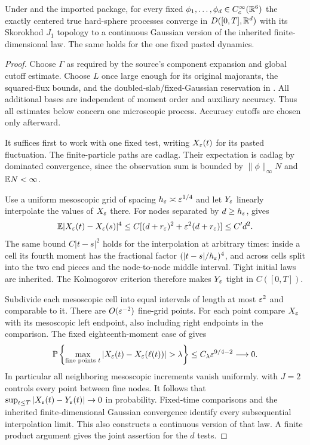 \begin{theorem}\label{thm:functional}
Under  and the imported package, for every fixed
$\phi_1,\ldots,\phi_d\in C_c^\infty(\mathbb R^6)$ the exactly centered true
hard-sphere processes converge in
$D([0,T],\mathbb R^d)$ with its Skorokhod $J_1$ topology to a continuous
Gaussian version of the inherited finite-dimensional law.
The same holds for the one fixed pasted dynamics.
\end{theorem}
\begin{proof}
Choose $\Gamma$ as required by the source's component expansion and
global cutoff estimate. Choose $L$ once large enough for its original
majorants, the squared-flux bounds, and the doubled-slab/fixed-Gaussian
reservation in . All additional bases are independent
of moment order and auxiliary accuracy. Thus all estimates below concern
one microscopic process. Accuracy cutoffs are chosen only afterward.

It suffices first to work with one fixed test, writing $X_\varepsilon(t)$ for
its pasted fluctuation. The finite-particle paths are cadlag.
Their expectation is cadlag by dominated convergence, since the
observation sum is bounded by $\|\phi\|_\infty N$ and $\mathbb E N<\infty$.

Use a uniform mesoscopic grid of spacing $h_\varepsilon\asymp\varepsilon^{1/4}$ and
let $Y_\varepsilon$ linearly interpolate the values of $X_\varepsilon$ there.
For nodes separated by $d\geq h_\varepsilon$,  gives
\[
 \mathbb E|X_\varepsilon(t)-X_\varepsilon(s)|^4
 \leq C[(d+r_\varepsilon)^2+\varepsilon^2(d+r_\varepsilon)]\leq C'd^2 .
\]
The same bound $C|t-s|^2$ holds for the interpolation at arbitrary times:
inside a cell its fourth moment has the fractional factor
$(|t-s|/h_\varepsilon)^4$, and across cells split into the two end pieces and
the node-to-node middle interval.
Tight initial laws are inherited. The Kolmogorov criterion therefore
makes $Y_\varepsilon$ tight in $C([0,T])$.

Subdivide each mesoscopic cell into equal intervals of length at most
$\varepsilon^2$ and comparable to it. There are $O(\varepsilon^{-2})$ fine-grid points.
For each point compare $X_\varepsilon$ with its mesoscopic left endpoint,
also including right endpoints in the comparison.
The fixed eighteenth-moment case of  gives
\[
 \Pp\left\{\max_{\text{fine points }t}
 |X_\eps(t)-X_\eps(\ell(t))|>\lambda\right\}
       \leq C_\lambda\eps^{9/4-2}\longrightarrow0 .
\]
In particular all neighboring mesoscopic increments vanish uniformly.
 with $J=2$ controls every point between fine nodes.
It follows that $\sup_{t\leq T}|X_\varepsilon(t)-Y_\varepsilon(t)|\to0$ in probability.
Fixed-time comparisons and the inherited finite-dimensional Gaussian
convergence identify every subsequential interpolation limit. This also
constructs a continuous version of that law. A finite product argument
gives the joint assertion for the $d$ tests.


\end{proof}
